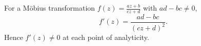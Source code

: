 For a Möbius transformation $f(z) = \frac{az+b}{cz+d}$ with $ad-bc \neq 0$,
$$f'(z) = \frac{ad - bc}{(cz + d)^2}.$$
Hence $f'(z) \neq 0$ at each point of analyticity.
